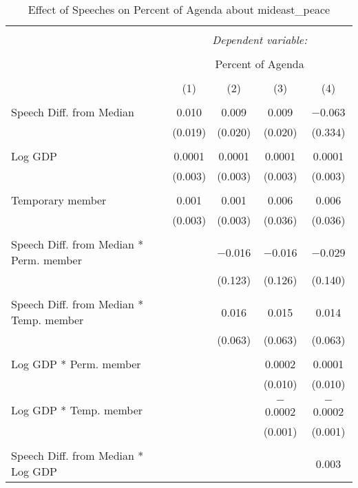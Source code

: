 
\begin{table}[!htbp] \centering 
  \caption{Effect of Speeches on Percent of Agenda about  mideast_peace} 
  \label{} 
\begin{tabular}{@{\extracolsep{5pt}}lcccc} 
\\[-1.8ex]\hline 
\hline \\[-1.8ex] 
 & \multicolumn{4}{c}{\textit{Dependent variable:}} \\ 
\cline{2-5} 
\\[-1.8ex] & \multicolumn{4}{c}{Percent of Agenda} \\ 
\\[-1.8ex] & (1) & (2) & (3) & (4)\\ 
\hline \\[-1.8ex] 
 Speech Diff. from Median & 0.010 & 0.009 & 0.009 & $-$0.063 \\ 
  & (0.019) & (0.020) & (0.020) & (0.334) \\ 
  & & & & \\ 
 Log GDP & 0.0001 & 0.0001 & 0.0001 & 0.0001 \\ 
  & (0.003) & (0.003) & (0.003) & (0.003) \\ 
  & & & & \\ 
 Temporary member & 0.001 & 0.001 & 0.006 & 0.006 \\ 
  & (0.003) & (0.003) & (0.036) & (0.036) \\ 
  & & & & \\ 
 Speech Diff. from Median * Perm. member &  & $-$0.016 & $-$0.016 & $-$0.029 \\ 
  &  & (0.123) & (0.126) & (0.140) \\ 
  & & & & \\ 
 Speech Diff. from Median * Temp. member &  & 0.016 & 0.015 & 0.014 \\ 
  &  & (0.063) & (0.063) & (0.063) \\ 
  & & & & \\ 
 Log GDP * Perm. member &  &  & 0.0002 & 0.0001 \\ 
  &  &  & (0.010) & (0.010) \\ 
  & & & & \\ 
 Log GDP * Temp. member &  &  & $-$0.0002 & $-$0.0002 \\ 
  &  &  & (0.001) & (0.001) \\ 
  & & & & \\ 
 Speech Diff. from Median * Log GDP &  &  &  & 0.003 \\ 

\end{tabular}
\end{table}
